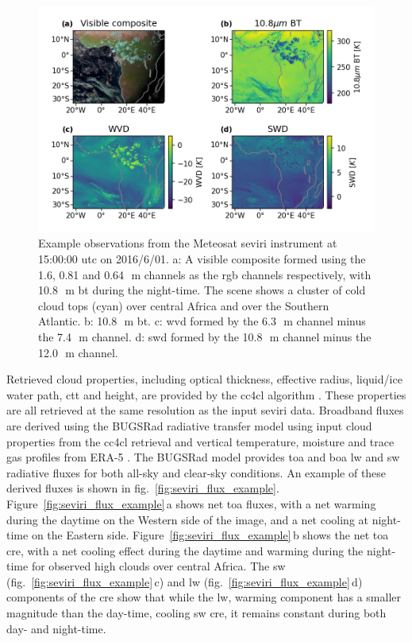 \documentclass[acp, manuscript]{copernicus}
\begin{document}
\begin{figure}[tp]
    \includegraphics[width=12cm]{figures/fig01.png}
    \caption[
    Example observations from the Meteosat \acrshort{seviri} instrument at 15:00:00 \acrshort{utc} on 2016/6/01
    ]{
    Example observations from the Meteosat \acrshort{seviri} instrument at 15:00:00 \acrshort{utc} on 2016/6/01. a: A visible composite formed using the 1.6, 0.81 and 0.64\,\unit{\mu m} channels as the \acrshort{rgb} channels respectively, with 10.8\,\unit{\mu m} \acrshort{bt} during the night-time. The scene shows a cluster of cold cloud tops (cyan) over central Africa and over the Southern Atlantic. b: 10.8\,\unit{\mu m} \acrshort{bt}. c: \acrshort{wvd} formed by the 6.3\,\unit{\mu m} channel minus the 7.4\,\unit{\mu m} channel. d: \acrshort{swd} formed by the 10.8\,\unit{\mu m} channel minus the 12.0\,\unit{\mu m} channel.
    }
    \label{fig:seviri_obs_example}
\end{figure}


Retrieved cloud properties, including optical thickness, effective radius, liquid/ice water path, \acrshort{ctt} and height, are provided by the \acrfull{cc4cl} algorithm \citep{sus_community_2018, mcgarragh_community_2018}. 
These properties are all retrieved at the same resolution as the input \acrshort{seviri} data. Broadband fluxes are derived using the BUGSRad radiative transfer model \citep{stephens_parameterization_2001} using input cloud properties from the \acrshort{cc4cl} retrieval and vertical temperature, moisture and trace gas profiles from ERA-5 \citep{hersbach_era5_2020}. 
The BUGSRad model provides \acrshort{toa} and \acrlong{boa} \acrshort{lw} and \acrshort{sw} radiative fluxes for both all-sky and clear-sky conditions. An example of these derived fluxes is shown in fig.~\ref{fig:seviri_flux_example}. 
Figure~\ref{fig:seviri_flux_example}\,a shows net \acrshort{toa} fluxes, with a net warming during the daytime on the Western side of the image, and a net cooling at night-time on the Eastern side. 
Figure~\ref{fig:seviri_flux_example}\,b shows the net \acrshort{toa} \acrshort{cre}, with a net cooling effect during the daytime and warming during the night-time for observed high clouds over central Africa. The \acrshort{sw} (fig.~\ref{fig:seviri_flux_example}\,c) and \acrshort{lw} (fig.~\ref{fig:seviri_flux_example}\,d) components of the \acrshort{cre} show that while the \acrshort{lw},
warming component has a smaller magnitude than the day-time, cooling \acrshort{sw} \acrshort{cre}, it remains constant during both day- and night-time.
\end{document}
